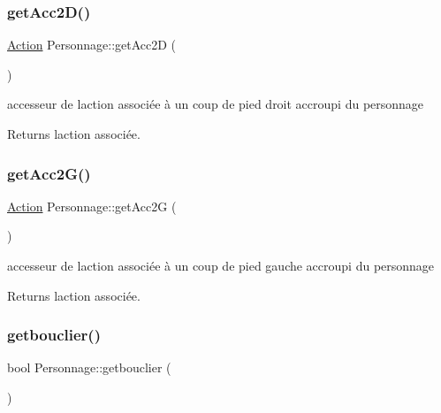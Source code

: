 \subsubsection{\texorpdfstring{get\+Acc2\+D()}{getAcc2D()}}
{\footnotesize\ttfamily \hyperlink{class_action}{Action} Personnage\+::get\+Acc2D (\begin{DoxyParamCaption}{ }\end{DoxyParamCaption})}



accesseur de l\textquotesingle{}action associée à un coup de pied droit accroupi du personnage 

\begin{DoxyReturn}{Returns}
l\textquotesingle{}action associée. 
\end{DoxyReturn}
\mbox{\label{class_personnage_a91c733051d83e5205f10d5e8c3b402bc}} 
\subsubsection{\texorpdfstring{get\+Acc2\+G()}{getAcc2G()}}
{\footnotesize\ttfamily \hyperlink{class_action}{Action} Personnage\+::get\+Acc2G (\begin{DoxyParamCaption}{ }\end{DoxyParamCaption})}



accesseur de l\textquotesingle{}action associée à un coup de pied gauche accroupi du personnage 

\begin{DoxyReturn}{Returns}
l\textquotesingle{}action associée. 
\end{DoxyReturn}
\mbox{\label{class_personnage_a98ae46585df4974b6839b6a6e63b9ae9}} 
\subsubsection{\texorpdfstring{getbouclier()}{getbouclier()}}
{\footnotesize\ttfamily bool Personnage\+::getbouclier (\begin{DoxyParamCaption}{ }\end{DoxyParamCaption})}



